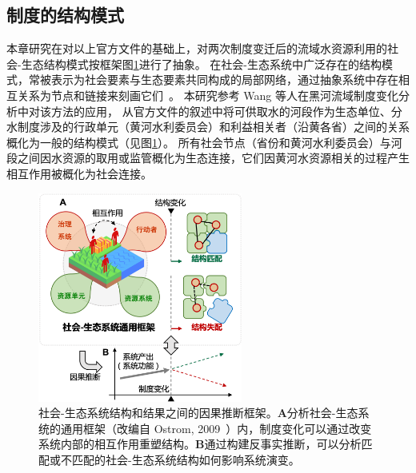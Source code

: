 \subsection{制度的结构模式}\label{sec:structures}

本章研究在对以上官方文件的基础上，对两次制度变迁后的流域水资源利用的社会-生态结构模式按框架图\ref{fig:framework}进行了抽象。
在社会-生态系统中广泛存在的结构模式，常被表示为社会要素与生态要素共同构成的局部网络，通过抽象系统中存在相互关系为节点和链接来刻画它们~\cite{bodin2017,kluger2020,guerrero2015}。
本研究参考 Wang 等人在黑河流域制度变化分析中对该方法的应用\cite{wang2019b}，
从官方文件的叙述中将可供取水的河段作为生态单位、分水制度涉及的行政单元（黄河水利委员会）和利益相关者（沿黄各省）之间的关系概化为一般的结构模式（见图\ref{fig:framework}）。
所有社会节点（省份和黄河水利委员会）与河段之间因水资源的取用或监管概化为生态连接，它们因黄河水资源相关的过程产生相互作用被概化为社会连接。

\begin{figure}[!ht] %
    \centering
    \includegraphics[width=0.6\textwidth]{img/ch5/ch5_framework.png}
    \caption[社会-生态系统结构和结果之间的因果推断框架]{社会-生态系统结构和结果之间的因果推断框架。\textbf{A}分析社会-生态系统的通用框架（改编自 Ostrom, 2009~\cite{ostrom2009}）内，制度变化可以通过改变系统内部的相互作用重塑结构。\textbf{B}通过构建反事实推断，可以分析匹配或不匹配的社会-生态系统结构如何影响系统演变。}\label{fig:framework}
\end{figure}

